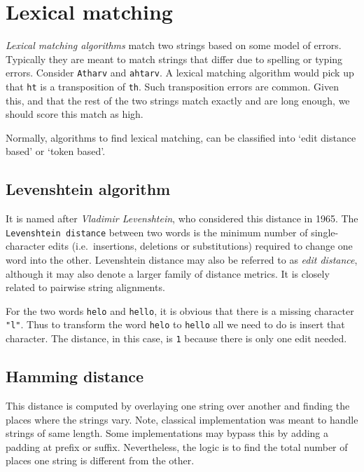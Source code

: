 \documentclass[
]{book}
\begin{document}
\hypertarget{lexical-matching}{%
\section{Lexical matching}\label{lexical-matching}}

\emph{Lexical matching algorithms} match two strings based on some model of errors. Typically they are meant to match strings that differ due to spelling or typing errors. Consider \texttt{Atharv} and \texttt{ahtarv}. A lexical matching algorithm would pick up that \texttt{ht} is a transposition of \texttt{th}. Such transposition errors are common. Given this, and that the rest of the two strings match exactly and are long enough, we should score this match as high.

Normally, algorithms to find lexical matching, can be classified into `edit distance based' or `token based'.

\hypertarget{levenshtein-algorithm}{%
\subsection{Levenshtein algorithm}\label{levenshtein-algorithm}}

It is named after \emph{Vladimir Levenshtein}, who considered this distance in 1965. The \texttt{Levenshtein\ distance} between two words is the minimum number of single-character edits (i.e.~insertions, deletions or substitutions) required to change one word into the other. Levenshtein distance may also be referred to as \emph{edit distance}, although it may also denote a larger family of distance metrics. It is closely related to pairwise string alignments.

For the two words \texttt{helo} and \texttt{hello}, it is obvious that there is a missing character \texttt{"l"}. Thus to transform the word \texttt{helo} to \texttt{hello} all we need to do is insert that character. The distance, in this case, is \texttt{1} because there is only one edit needed.

\hypertarget{hamming-distance}{%
\subsection{Hamming distance}\label{hamming-distance}}

This distance is computed by overlaying one string over another and finding the places where the strings vary. Note, classical implementation was meant to handle strings of same length. Some implementations may bypass this by adding a padding at prefix or suffix. Nevertheless, the logic is to find the total number of places one string is different from the other.
\end{document}
